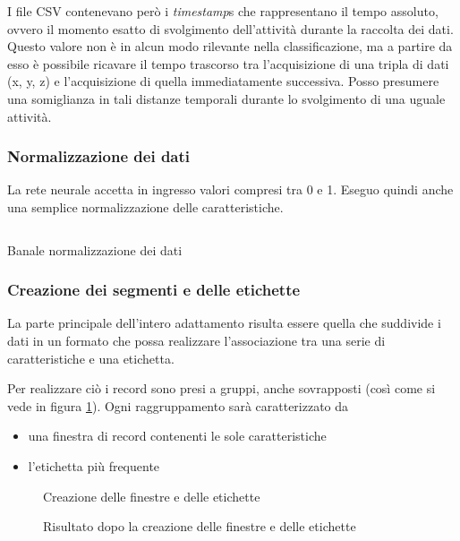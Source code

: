 I file CSV contenevano però i \textit{timestamp}s che rappresentano il tempo assoluto, 
ovvero il momento esatto di svolgimento dell'attività durante la raccolta dei dati.
Questo valore non è in alcun modo rilevante nella classificazione, ma a partire da esso è possibile ricavare il tempo trascorso 
tra l'acquisizione di una tripla di dati (x, y, z) e l'acquisizione di quella immediatamente successiva.
Posso presumere una somiglianza in tali distanze temporali durante lo svolgimento di una uguale attività.

\subsubsection{Normalizzazione dei dati}
La rete neurale accetta in ingresso valori compresi tra 0 e 1. Eseguo quindi anche una semplice normalizzazione delle caratteristiche.
\begin{listing}[H] 
    \inputminted[frame=single,framesep=10pt]{python}{assets/snippets/classifier/normalize_data.py}
    \caption{Banale normalizzazione dei dati}
\end{listing}

\newpage
\subsubsection{Creazione dei segmenti e delle etichette}
La parte principale dell'intero adattamento risulta essere quella che suddivide i dati in un formato che possa 
realizzare l'associazione tra una serie di caratteristiche e una etichetta.

Per realizzare ciò i record sono presi a gruppi, anche sovrapposti (così come si vede in figura \ref{fig:create_segments_and_labels}). 
Ogni raggruppamento sarà caratterizzato da 
\begin{itemize}
    \item una finestra di record contenenti le sole caratteristiche
    \item l'etichetta più frequente
\end{itemize}

\begin{figure}[H]
  \centering
  
  \caption{Creazione delle finestre e delle etichette}
  \label{fig:create_segments_and_labels}
\end{figure}

\begin{figure}[H]
  \centering
  
  \caption{Risultato dopo la creazione delle finestre e delle etichette}
  \label{fig:segments_and_labels}
\end{figure}

